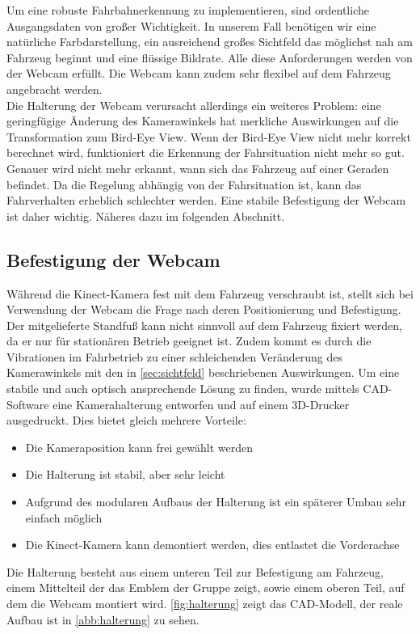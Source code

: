 Um eine robuste Fahrbahnerkennung zu implementieren, sind ordentliche Ausgangsdaten von großer Wichtigkeit.
In unserem Fall benötigen wir eine natürliche Farbdarstellung, ein ausreichend großes Sichtfeld das möglichst nah am Fahrzeug beginnt und eine flüssige Bildrate. 
Alle diese Anforderungen werden von der Webcam erfüllt.
Die Webcam kann zudem sehr flexibel auf dem Fahrzeug angebracht werden.
\\
Die Halterung der Webcam verursacht allerdings ein weiteres Problem: eine geringfügige Änderung des Kamerawinkels hat merkliche Auswirkungen auf die Transformation zum Bird-Eye View.
Wenn der Bird-Eye View nicht mehr korrekt berechnet wird, funktioniert die Erkennung der Fahrsituation nicht mehr so gut.
Genauer wird nicht mehr erkannt, wann sich das Fahrzeug auf einer Geraden befindet.
Da die Regelung abhängig von der Fahrsituation ist, kann das Fahrverhalten erheblich schlechter werden. Eine stabile Befestigung der Webcam ist daher wichtig. Näheres dazu im folgenden Abschnitt.

\subsection{Befestigung der Webcam}
\label{sec:befestigung}
Während die Kinect-Kamera fest mit dem Fahrzeug verschraubt ist, stellt sich bei Verwendung der Webcam die Frage nach deren Positionierung und Befestigung. Der mitgelieferte Standfuß kann nicht sinnvoll auf dem Fahrzeug fixiert werden, da er nur für stationären Betrieb geeignet ist. Zudem kommt es durch die Vibrationen im Fahrbetrieb zu einer schleichenden Veränderung des Kamerawinkels mit den in \autoref{sec:sichtfeld} beschriebenen Auswirkungen.
Um eine stabile und auch optisch ansprechende Lösung zu finden, wurde mittels CAD-Software eine Kamerahalterung entworfen und auf einem 3D-Drucker ausgedruckt. Dies bietet gleich mehrere Vorteile:

\begin{itemize}
	\item Die Kameraposition kann frei gewählt werden
	\item Die Halterung ist stabil, aber sehr leicht
	\item Aufgrund des modularen Aufbaus der Halterung ist ein späterer Umbau sehr einfach möglich
	\item Die Kinect-Kamera kann demontiert werden, dies entlastet die Vorderachse
\end{itemize}

Die Halterung besteht aus einem unteren Teil zur Befestigung am Fahrzeug, einem Mittelteil der das Emblem der Gruppe zeigt, sowie einem oberen Teil, auf dem die Webcam montiert wird. \autoref{fig:halterung} zeigt das CAD-Modell, der reale Aufbau ist in \autoref{abb:halterung} zu sehen.

